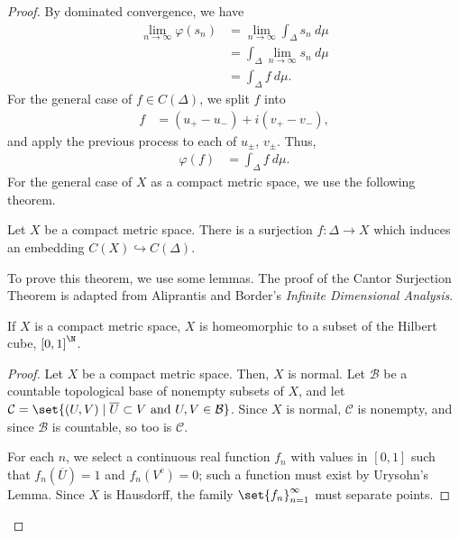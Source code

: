 \documentclass[10pt]{mypackage}
\begin{document}
\begin{proof}
  By dominated convergence, we have
  \begin{align*}
    \lim_{n\rightarrow\infty}\varphi\left(s_n\right) &= \lim_{n\rightarrow\infty}\int_{\Delta}^{} s_n\:d\mu\\
                                                     &= \int_{\Delta}^{} \lim_{n\rightarrow\infty}s_n\:d\mu\\
                                                     &= \int_{\Delta}^{} f\:d\mu.
  \end{align*}
  For the general case of $f\in C\left(\Delta\right)$, we split $f$ into
  \begin{align*}
    f &= \left(u_{+} - u_{-}\right) + i\left(v_{+} - v_{-}\right),
  \end{align*}
  and apply the previous process to each of $u_{\pm}$, $v_{\pm}$. Thus,
  \begin{align*}
    \varphi(f) &= \int_{\Delta}^{} f\:d\mu.
  \end{align*}
  For the general case of $X$ as a compact metric space, we use the following theorem.
  \begin{theorem}
    Let $X$ be a compact metric space. There is a surjection $f: \Delta \rightarrow X$ which induces an embedding $C(X) \hookrightarrow C\left(\Delta\right)$.
  \end{theorem}
  To prove this theorem, we use some lemmas. The proof of the Cantor Surjection Theorem is adapted from Aliprantis and Border's \textit{Infinite Dimensional Analysis}.
  \begin{lemma}
    If $X$ is a compact metric space, $X$ is homeomorphic to a subset of the Hilbert cube, $\left[0,1\right]^{\N}$.
  \end{lemma}
  \begin{proof}
    Let $X$ be a compact metric space. Then, $X$ is normal. Let $\mathcal{B}$ be a countable topological base of nonempty subsets of $X$, and let $\mathcal{C} = \set{\left(U,V\right)\mid \overline{U}\subset V\text{ and }U,V\in \mathcal{B}}$. Since $X$ is normal, $\mathcal{C}$ is nonempty, and since $\mathcal{B}$ is countable, so too is $\mathcal{C}$.\newline

    For each $n$, we select a continuous real function $f_n$ with values in $[0,1]$ such that $f_n\left(\overline{U}\right) = 1$ and $f_n\left(V^{c}\right) = 0$; such a function must exist by Urysohn's Lemma. Since $X$ is Hausdorff, the family $\set{f_n}_{n=1}^{\infty}$ must separate points.\newline


\end{proof}
\end{proof}
\end{document}
